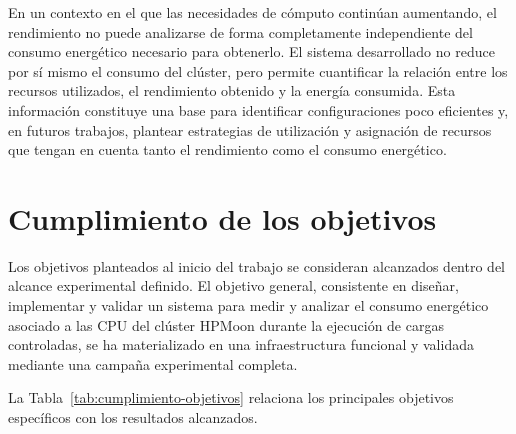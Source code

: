 En un contexto en el que las necesidades de cómputo continúan aumentando, el rendimiento no puede analizarse de forma completamente independiente del consumo energético necesario para obtenerlo. El sistema desarrollado no reduce por sí mismo el consumo del clúster, pero permite cuantificar la relación entre los recursos utilizados, el rendimiento obtenido y la energía consumida. Esta información constituye una base para identificar configuraciones poco eficientes y, en futuros trabajos, plantear estrategias de utilización y asignación de recursos que tengan en cuenta tanto el rendimiento como el consumo energético.

\section{Cumplimiento de los objetivos}
\label{sec:objetivos-cumplimiento}

Los objetivos planteados al inicio del trabajo se consideran alcanzados dentro del alcance experimental definido. El objetivo general, consistente en diseñar, implementar y validar un sistema para medir y analizar el consumo energético asociado a las CPU del clúster HPMoon durante la ejecución de cargas controladas, se ha materializado en una infraestructura funcional y validada mediante una campaña experimental completa.

La Tabla~\ref{tab:cumplimiento-objetivos} relaciona los principales objetivos específicos con los resultados alcanzados.

\begingroup
\small
\setlength{\tabcolsep}{4pt}
\renewcommand{\arraystretch}{1.16}

